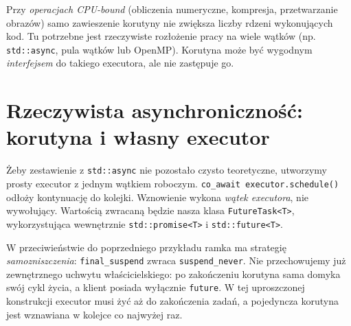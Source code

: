 Przy \emph{operacjach CPU-bound} (obliczenia numeryczne, kompresja,
przetwarzanie obrazów) samo zawieszenie korutyny nie zwiększa
liczby rdzeni wykonujących kod. Tu potrzebne jest rzeczywiste
rozłożenie pracy na wiele wątków (np. \texttt{std::async}, pula
wątków lub OpenMP). Korutyna może być wygodnym \emph{interfejsem}
do takiego executora, ale nie zastępuje go.

\section{Rzeczywista asynchroniczność: korutyna i własny executor}
\label{sec:cpp15-executor}

Żeby zestawienie z \texttt{std::async} nie pozostało czysto
teoretyczne, utworzymy prosty executor z jednym wątkiem roboczym.
\texttt{co\_await executor.schedule()} odłoży kontynuację do
kolejki. Wznowienie wykona \emph{wątek executora}, nie wywołujący.
Wartością zwracaną będzie nasza klasa \texttt{FutureTask<T>},
wykorzystująca wewnętrznie \texttt{std::promise<T>} i
\texttt{std::future<T>}.

W przeciwieństwie do poprzedniego przykładu ramka ma strategię
\emph{samozniszczenia}: \texttt{final\_suspend} zwraca \texttt{suspend\_never}.
Nie przechowujemy już zewnętrznego uchwytu właścicielskiego:
po zakończeniu korutyna sama domyka swój cykl życia, a klient posiada
wyłącznie \texttt{future}. W tej uproszczonej konstrukcji executor
musi żyć aż do zakończenia zadań, a pojedyncza korutyna jest
wznawiana w kolejce co najwyżej raz.


